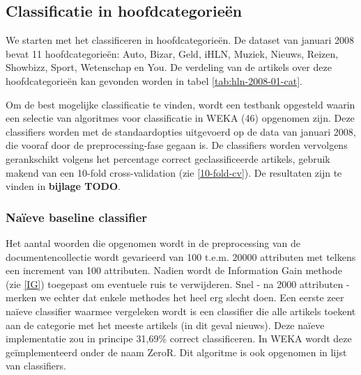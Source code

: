\subsection{Classificatie in hoofdcategorie\"en}
We starten met het classificeren in hoofdcategorie\"en. De dataset van januari 2008 bevat 11 hoofdcategorie\"en: Auto, Bizar, Geld, iHLN, Muziek, Nieuws, Reizen, Showbizz, Sport, Wetenschap en You. De verdeling van de artikels over deze hoofdcategorie\"en kan gevonden worden in tabel \ref{tab:hln-2008-01-cat}.

Om de best mogelijke classificatie te vinden, wordt een testbank opgesteld waarin een selectie van algoritmes voor classificatie in WEKA (46) opgenomen zijn. Deze classifiers worden met de standaardopties uitgevoerd op de data van januari 2008, die vooraf door de preprocessing-fase gegaan is. De classifiers worden vervolgens gerankschikt volgens het percentage correct geclassificeerde artikels, gebruik makend van een 10-fold cross-validation (zie \ref{10-fold-cv}). De resultaten zijn te vinden in \textbf{bijlage TODO}.

\subsubsection{Na\"ieve baseline classifier}\label{naieve-classifier}
Het aantal woorden die opgenomen wordt in de preprocessing van de documentencollectie wordt gevarieerd van 100 t.e.m. 20000 attributen met telkens een increment van 100 attributen. Nadien wordt de Information Gain methode (zie \ref{IG}) toegepast om eventuele ruis te verwijderen. Snel - na 2000 attributen - merken we echter dat enkele methodes het heel erg slecht doen. Een eerste zeer na\"ieve classifier waarmee vergeleken wordt is een classifier die alle artikels toekent aan de categorie met het meeste artikels (in dit geval nieuws). Deze na\"ieve implementatie zou in principe 31,69\% correct classificeren. In WEKA wordt deze ge\"implementeerd onder de naam ZeroR. Dit algoritme is ook opgenomen in lijst van classifiers. 

